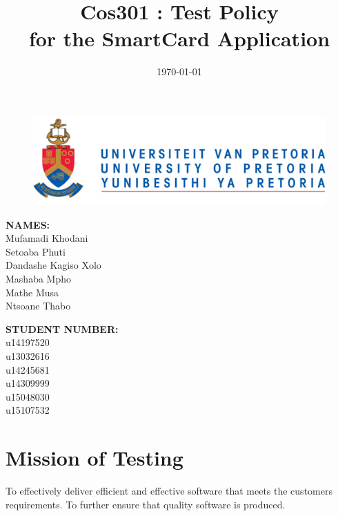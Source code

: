 \documentclass[english]{article}
\title{Cos301 : Test Policy\\
	for the SmartCard Application\\
}
\date{\today}
\begin{document}
	\maketitle
	\begin{figure}[!t]
		\includegraphics{up_logo.png}
	\end{figure}
	\begin{minipage}{0.4\textwidth}
		\begin{flushleft} \large
			\textbf{NAMES:}\\[0.4cm]
			Mufamadi {Khodani} \\
			Setoaba {Phuti} \\
			Dandashe {Kagiso Xolo} \\
			Mashaba {Mpho} \\
			Mathe {Musa} \\
			Ntsoane {Thabo}\\
		\end{flushleft}
	\end{minipage}
	\begin{minipage}{0.4\textwidth}
		\begin{flushright} \large
			\textbf{STUDENT NUMBER:} \\[0.4cm]
			u14197520 \\
			u13032616 \\
			u14245681 \\
			u14309999 \\
			u15048030 \\
			u15107532 \\
		\end{flushright}
	\end{minipage}
	
	
	\newpage
	
	\tableofcontents
	
	
	
	\newpage

	


	

	\section{Mission of Testing}
	To effectively deliver efficient and effective software that meets the customers requirements. To further ensure that quality software is produced.  
\end{document}
